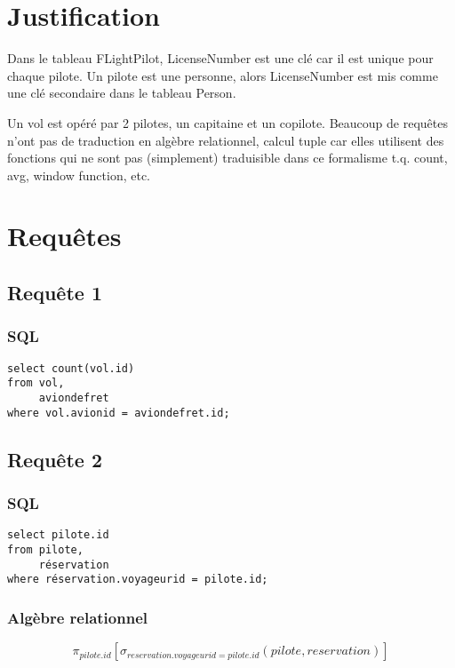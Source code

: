 \documentclass[french, utf8]{article}
\begin{document}
\section{Justification}
Dans le tableau FLightPilot, LicenseNumber est une clé car il est unique pour chaque pilote. Un pilote est une personne, alors LicenseNumber est mis comme une clé secondaire dans le tableau Person.

\newline

Un vol est opéré par 2 pilotes, un capitaine et un copilote.
\newline
Beaucoup de requêtes n'ont pas de traduction en algèbre relationnel, calcul tuple car elles utilisent des fonctions qui ne sont pas (simplement) traduisible dans ce formalisme t.q. count, avg, window function, etc.
\newpage

\section{Requêtes}
\subsection{Requête 1}
\subsubsection{SQL}
\begin{verbatim}
select count(vol.id)
from vol,
     aviondefret
where vol.avionid = aviondefret.id;
\end{verbatim}

\newpage

\subsection{Requête 2}

\subsubsection{SQL}
\begin{verbatim}
select pilote.id
from pilote,
     réservation
where réservation.voyageurid = pilote.id;
\end{verbatim}
\subsubsection{Algèbre relationnel}
\[ \pi_{pilote.id}[\sigma_{reservation.voyageurid=pilote.id}(pilote, reservation)]\]
\end{document}
